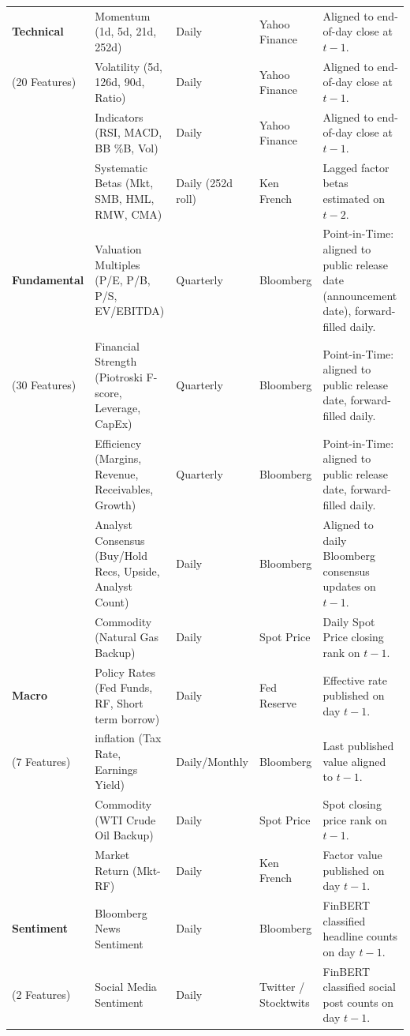 \documentclass[11pt]{article}
\begin{document}
\begin{longtable}{p{2.5cm} p{4.0cm} p{2.2cm} p{2.0cm} p{4.5cm}}
    \bottomrule
    \endlastfoot
    \textbf{Technical} & Momentum (1d, 5d, 21d, 252d) & Daily & Yahoo Finance & Aligned to end-of-day close at $t-1$. \\
    (20 Features) & Volatility (5d, 126d, 90d, Ratio) & Daily & Yahoo Finance & Aligned to end-of-day close at $t-1$. \\
    & Indicators (RSI, MACD, BB \%B, Vol) & Daily & Yahoo Finance & Aligned to end-of-day close at $t-1$. \\
    & Systematic Betas (Mkt, SMB, HML, RMW, CMA) & Daily (252d roll) & Ken French & Lagged factor betas estimated on $t-2$. \\
    \midrule
    \textbf{Fundamental} & Valuation Multiples (P/E, P/B, P/S, EV/EBITDA) & Quarterly & Bloomberg & Point-in-Time: aligned to public release date (announcement date), forward-filled daily. \\
    (30 Features) & Financial Strength (Piotroski F-score, Leverage, CapEx) & Quarterly & Bloomberg & Point-in-Time: aligned to public release date, forward-filled daily. \\
    & Efficiency (Margins, Revenue, Receivables, Growth) & Quarterly & Bloomberg & Point-in-Time: aligned to public release date, forward-filled daily. \\
    & Analyst Consensus (Buy/Hold Recs, Upside, Analyst Count) & Daily & Bloomberg & Aligned to daily Bloomberg consensus updates on $t-1$. \\
    & Commodity (Natural Gas Backup) & Daily & Spot Price & Daily Spot Price closing rank on $t-1$. \\
    \midrule
    \textbf{Macro} & Policy Rates (Fed Funds, RF, Short term borrow) & Daily & Fed Reserve & Effective rate published on day $t-1$. \\
    (7 Features) & inflation (Tax Rate, Earnings Yield) & Daily/Monthly & Bloomberg & Last published value aligned to $t-1$. \\
    & Commodity (WTI Crude Oil Backup) & Daily & Spot Price & Spot closing price rank on $t-1$. \\
    & Market Return (Mkt-RF) & Daily & Ken French & Factor value published on day $t-1$. \\
    \midrule
    \textbf{Sentiment} & Bloomberg News Sentiment & Daily & Bloomberg & FinBERT classified headline counts on day $t-1$. \\
    (2 Features) & Social Media Sentiment & Daily & Twitter / Stocktwits & FinBERT classified social post counts on day $t-1$. \\
\end{longtable}
\end{document}
